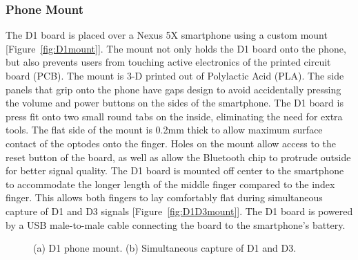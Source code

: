         \subsubsection{Phone Mount}
        The D1 board is placed over a Nexus 5X smartphone using a custom mount [Figure~\ref{fig:D1mount}]. The mount not only holds the D1 board onto the phone, but also prevents users from touching active electronics of the printed circuit board (PCB). The mount is 3-D printed out of Polylactic Acid (PLA). The side panels that grip onto the phone have gaps design to avoid accidentally pressing the volume and power buttons on the sides of the smartphone. The D1 board is press fit onto two small round tabs on the inside, eliminating the need for extra tools. The flat side of the mount is 0.2mm thick to allow maximum surface contact of the optodes onto the finger. Holes on the mount allow access to the reset button of the board, as well as allow the Bluetooth chip to protrude outside for better signal quality. The D1 board is mounted off center to the smartphone to accommodate the longer length of the middle finger compared to the index finger. This allows both fingers to lay comfortably flat during simultaneous capture of D1 and D3 signals [Figure~\ref{fig:D1D3mount}]. The D1 board is powered by a USB male-to-male cable connecting the board to the smartphone’s battery. 

        \begin{figure}
        	\begin{center}
        	\end{center}
        	\caption{(a) D1 phone mount. (b) Simultaneous capture of D1 and D3.} 
        	\label{fig:D1hardware}
        \end{figure} 
        
